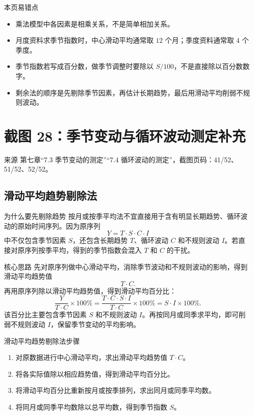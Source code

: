 \documentclass[UTF8,zihao=-4,fontset=fandol]{ctexart}
\begin{document}
\begin{warnbox}{本页易错点}
\begin{itemize}
  \item 乘法模型中各因素是相乘关系，不是简单相加关系。
  \item 月度资料求季节指数时，中心滑动平均通常取 $12$ 个月；季度资料通常取 $4$ 个季度。
  \item 季节指数若写成百分数，做季节调整时要除以 $S/100$，不是直接除以百分数数字。
  \item 剩余法的顺序是先剔除季节因素，再估计长期趋势，最后用滑动平均削弱不规则波动。
\end{itemize}
\end{warnbox}

\section{截图 28：季节变动与循环波动测定补充}

\begin{sourcebox}{来源}
第七章“7.3 季节变动的测定”“7.4 循环波动的测定”，截图页码：41/52、51/52、52/52。
\end{sourcebox}

\subsection{滑动平均趋势剔除法}

\begin{keybox}{为什么要先剔除趋势}
按月或按季平均法不宜直接用于含有明显长期趋势、循环波动的原始时间序列。因为原序列
\[
Y=T\cdot S\cdot C\cdot I
\]
中不仅包含季节因素 $S$，还包含长期趋势 $T$、循环波动 $C$ 和不规则波动 $I$。若直接对原序列按季平均，得到的季节指数会混入 $T$ 和 $C$ 的干扰。
\end{keybox}

\begin{methodbox}{核心思路}
先对原序列做中心滑动平均，消除季节波动和不规则波动的影响，得到滑动平均趋势值
\[
T\cdot C.
\]
再用原序列除以滑动平均趋势值，得到滑动平均百分比：
\[
\frac{Y}{T\cdot C}\times 100\%
=\frac{T\cdot C\cdot S\cdot I}{T\cdot C}\times 100\%
=S\cdot I\times 100\%.
\]
该百分比主要包含季节因素 $S$ 和不规则波动 $I$。再按同月或同季求平均，即可削弱不规则波动 $I$，保留季节变动的平均影响。
\end{methodbox}

\begin{methodbox}{滑动平均趋势剔除法步骤}
\begin{enumerate}
  \item 对原数据进行中心滑动平均，求出滑动平均趋势值 $T\cdot C$。
  \item 将各实际值除以相应趋势值，得到滑动平均百分比。
  \item 将滑动平均百分比重新按月或按季排列，求出同月或同季平均数。
  \item 将同月或同季平均数除以总平均数，得到季节指数 $S$。
\end{enumerate}
\end{methodbox}
\end{document}
